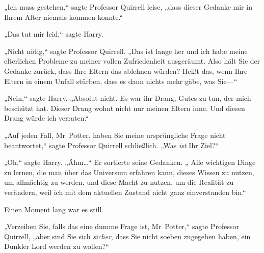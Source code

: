 „Ich muss gestehen,“ sagte Professor Quirrell leise, „dass dieser Gedanke mir in Ihrem Alter niemals kommen konnte.“

„Das tut mir leid,“ sagte Harry.

„Nicht nötig,“ sagte Professor Quirrell. „Das ist lange her und ich habe meine elterlichen Probleme zu meiner vollen Zufriedenheit ausgeräumt. Also hält Sie der Gedanke zurück, dass Ihre Eltern das ablehnen würden? Heißt das, wenn Ihre Eltern in einem Unfall stürben, dass es dann nichts mehr gäbe, was Sie—“

„Nein,“ sagte Harry. „Absolut nicht. Es war ihr Drang, Gutes zu tun, der mich beschützt hat. Dieser Drang wohnt nicht nur meinen Eltern inne. Und diesen Drang würde ich verraten.“

„Auf jeden Fall, Mr~Potter, haben Sie meine ursprüngliche Frage nicht beantwortet,“ sagte Professor Quirrell schließlich. „Was \emph{ist} Ihr Ziel?“

„Oh,“ sagte Harry. „Ähm…“ Er sortierte seine Gedanken. „ Alle wichtigen Dinge zu lernen, die man über das Universum erfahren kann, dieses Wissen zu nutzen, um allmächtig zu werden, und diese Macht zu nutzen, um die Realität zu verändern, weil ich mit dem aktuellen Zustand nicht ganz einverstanden bin.“

Einen Moment lang war es still.

„Verzeihen Sie, falls das eine dumme Frage ist, Mr~Potter,“ sagte Professor Quirrell, „aber sind Sie sich \emph{sicher}, dass Sie nicht soeben zugegeben haben, ein Dunkler Lord werden zu wollen?“

